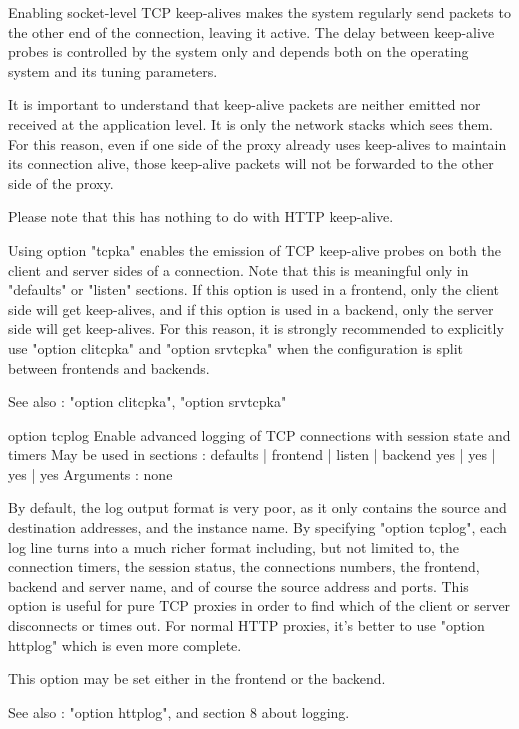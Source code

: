   Enabling socket-level TCP keep-alives makes the system regularly send packets
  to the other end of the connection, leaving it active. The delay between
  keep-alive probes is controlled by the system only and depends both on the
  operating system and its tuning parameters.

  It is important to understand that keep-alive packets are neither emitted nor
  received at the application level. It is only the network stacks which sees
  them. For this reason, even if one side of the proxy already uses keep-alives
  to maintain its connection alive, those keep-alive packets will not be
  forwarded to the other side of the proxy.

  Please note that this has nothing to do with HTTP keep-alive.

  Using option "tcpka" enables the emission of TCP keep-alive probes on both
  the client and server sides of a connection. Note that this is meaningful
  only in "defaults" or "listen" sections. If this option is used in a
  frontend, only the client side will get keep-alives, and if this option is
  used in a backend, only the server side will get keep-alives. For this
  reason, it is strongly recommended to explicitly use "option clitcpka" and
  "option srvtcpka" when the configuration is split between frontends and
  backends.

  See also : "option clitcpka", "option srvtcpka"


option tcplog
  Enable advanced logging of TCP connections with session state and timers
  May be used in sections :   defaults | frontend | listen | backend
                                 yes   |    yes   |   yes  |   yes
  Arguments : none

  By default, the log output format is very poor, as it only contains the
  source and destination addresses, and the instance name. By specifying
  "option tcplog", each log line turns into a much richer format including, but
  not limited to, the connection timers, the session status, the connections
  numbers, the frontend, backend and server name, and of course the source
  address and ports. This option is useful for pure TCP proxies in order to
  find which of the client or server disconnects or times out. For normal HTTP
  proxies, it's better to use "option httplog" which is even more complete.

  This option may be set either in the frontend or the backend.

  See also :  "option httplog", and section 8 about logging.


